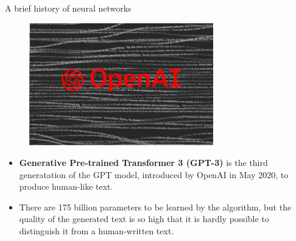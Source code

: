 \begin{vbframe}{A brief history of neural networks}
\begin{figure}
\centering
\includegraphics[width=8cm]{figure/gpt3.png}
\end{figure}
\footnotesize
\begin{itemize}
\item\textbf{Generative Pre-trained Transformer 3 (GPT-3)} is the third generatation of the GPT model, introduced by OpenAI in May 2020, to produce human-like text.
\vspace{.1cm}
\item There are 175 billion parameters to be learned by the algorithm, but the quality of the generated text is so high that it is hardly possible to distinguish it from a human-written text.
\end{itemize}
\end{vbframe}

\endlecture
